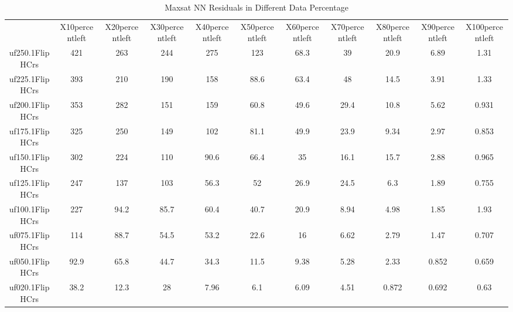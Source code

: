 \begin{table}[htbp]
\caption{Maxsat NN Residuals in Different Data Percentage}
\centering
\begin{tabular}{|ccccccccccc|}
\hline
 & X10percentleft & X20percentleft & X30percentleft & X40percentleft & X50percentleft & X60percentleft & X70percentleft & X80percentleft & X90percentleft & X100percentleft \\
uf250.1FlipHCrs &  421 &  263 &  244 &  275 &  123 & 68.3 &   39 & 20.9 & 6.89 & 1.31 \\
uf225.1FlipHCrs &  393 &  210 &  190 &  158 & 88.6 & 63.4 &   48 & 14.5 & 3.91 & 1.33 \\
uf200.1FlipHCrs &  353 &  282 &  151 &  159 & 60.8 & 49.6 & 29.4 & 10.8 & 5.62 & 0.931 \\
uf175.1FlipHCrs &  325 &  250 &  149 &  102 & 81.1 & 49.9 & 23.9 & 9.34 & 2.97 & 0.853 \\
uf150.1FlipHCrs &  302 &  224 &  110 & 90.6 & 66.4 &   35 & 16.1 & 15.7 & 2.88 & 0.965 \\
uf125.1FlipHCrs &  247 &  137 &  103 & 56.3 &   52 & 26.9 & 24.5 &  6.3 & 1.89 & 0.755 \\
uf100.1FlipHCrs &  227 & 94.2 & 85.7 & 60.4 & 40.7 & 20.9 & 8.94 & 4.98 & 1.85 & 1.93 \\
uf075.1FlipHCrs &  114 & 88.7 & 54.5 & 53.2 & 22.6 &   16 & 6.62 & 2.79 & 1.47 & 0.707 \\
uf050.1FlipHCrs & 92.9 & 65.8 & 44.7 & 34.3 & 11.5 & 9.38 & 5.28 & 2.33 & 0.852 & 0.659 \\
uf020.1FlipHCrs & 38.2 & 12.3 &   28 & 7.96 &  6.1 & 6.09 & 4.51 & 0.872 & 0.692 & 0.63 \\
\hline
\end{tabular}
\end{table}
